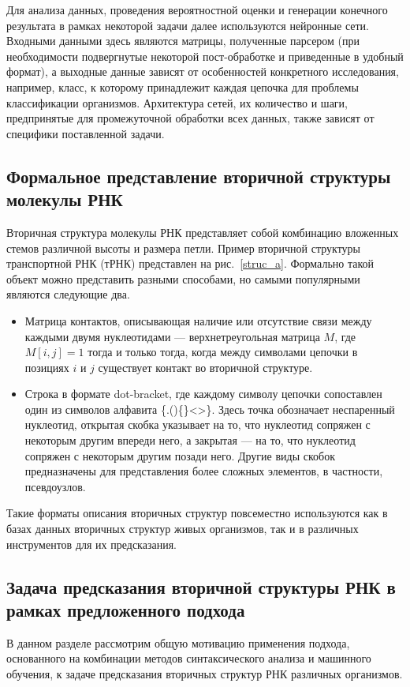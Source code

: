 \documentclass[14pt]{matmex-diploma-custom}
\begin{document}
Для анализа данных, проведения вероятностной оценки и генерации конечного результата в рамках некоторой задачи далее используются нейронные сети. Входными данными здесь являются матрицы, полученные парсером (при необходимости подвергнутые некоторой пост-обработке и приведенные в удобный формат), а выходные данные зависят от особенностей конкретного исследования, например, класс, к которому принадлежит каждая цепочка для проблемы классификации организмов. Архитектура сетей, их количество и шаги, предпринятые для промежуточной обработки всех данных, также зависят от специфики поставленной задачи.

\subsection{Формальное представление вторичной структуры молекулы РНК}
Вторичная структура молекулы РНК представляет собой комбинацию вложенных стемов различной высоты и размера петли. Пример вторичной структуры транспортной РНК (тРНК) представлен на рис.~\ref{struc_a}. Формально такой объект можно представить разными способами, но самыми популярными являются следующие два.
\begin{itemize}
    \item Матрица контактов, описывающая наличие или отсутствие связи между каждыми двумя нуклеотидами --- верхнетреугольная матрица $M$, где $M[i,j]=1$ тогда и только тогда, когда между символами цепочки в позициях $i$ и $j$ существует контакт во вторичной структуре.
    \item Строка в формате dot-bracket, где каждому символу цепочки сопоставлен один из символов алфавита \{.()\{\}<>\}. Здесь точка обозначает неспаренный нуклеотид, открытая скобка указывает на то, что нуклеотид сопряжен с некоторым другим впереди него, а закрытая --- на то, что нуклеотид сопряжен с некоторым другим позади него. Другие виды скобок предназначены для представления более сложных элементов, в частности, псевдоузлов.
\end{itemize}

Такие форматы описания вторичных структур повсеместно используются как в базах данных вторичных структур живых организмов, так и в различных инструментов для их предсказания.

\subsection{Задача предсказания вторичной структуры РНК в рамках предложенного подхода}
В данном разделе рассмотрим общую мотивацию применения подхода, основанного на комбинации методов синтаксического анализа и машинного обучения, к задаче предсказания вторичных структур РНК различных организмов. 
\end{document}
